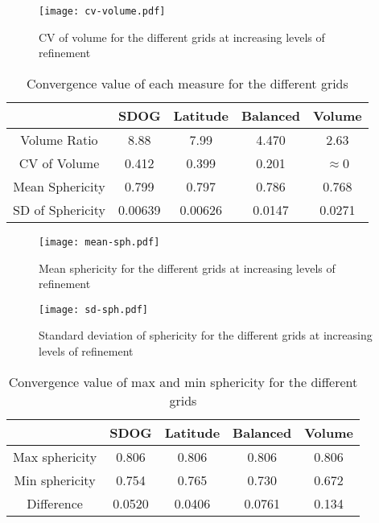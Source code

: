 \begin{figure}[p!]
	\centering
	\texttt{[image: cv-volume.pdf]}
	\caption[Graph of CV of volume for the different grids]{
		CV of volume for the different grids at increasing levels of refinement
	}
	\label{fig:cv}
\end{figure}


\begin{table}[htp!]
	\centering
	\caption[Convergence values of measures for the different grids]{
		Convergence value of each measure for the different grids
	}
	\begin{tabular}{@{} c c c c c @{}}
		\toprule
		                 & SDOG    & Latitude & Balanced & Volume     \\ \midrule
		Volume Ratio     & 8.88    & 7.99     & 4.470    & 2.63       \\
		CV of Volume     & 0.412   & 0.399    & 0.201    & $\approx$0 \\
		Mean Sphericity  & 0.799   & 0.797    & 0.786    & 0.768      \\
		SD of Sphericity & 0.00639 & 0.00626  & 0.0147   & 0.0271     \\ \bottomrule
	\end{tabular}
	\label{tab:results}
\end{table}


\begin{figure}[p!]
	\centering
	\texttt{[image: mean-sph.pdf]}
	\caption[Graph of mean sphericity for the different grids]{
		Mean sphericity for the different grids at increasing levels of refinement
	}
	\label{fig:sph}
\end{figure}


\begin{figure}[p!]
	\centering
	\texttt{[image: sd-sph.pdf]}
	\caption[Graph of SD of sphericity for the different grids]{
		Standard deviation of sphericity for the different grids at increasing levels of refinement
	}
	\label{fig:sd-sph}
\end{figure}


\begin{table}[htp!]
	\centering
	\caption[Convergence values of max and min sphericity for the different grids]{
		Convergence value of max and min sphericity for the different grids
	}
	\begin{tabular}{@{} c c c c c @{}}
		\toprule
		               & SDOG   & Latitude & Balanced & Volume \\ \midrule
		Max sphericity & 0.806  & 0.806    & 0.806    & 0.806  \\
		Min sphericity & 0.754  & 0.765    & 0.730    & 0.672  \\
		Difference     & 0.0520 & 0.0406   & 0.0761   & 0.134  \\ \bottomrule
	\end{tabular}
	\label{tab:results-sph}
\end{table}


